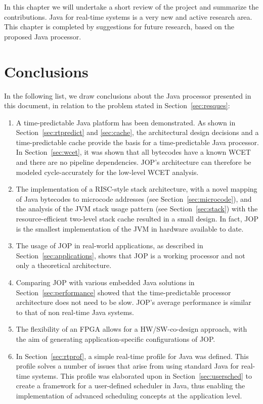 
In this chapter we will undertake a short review of the project and
summarize the contributions. Java for real-time systems is a very
new and active research area. This chapter is completed by
suggestions for future research, based on the proposed Java
processor.

\section{Conclusions}

In the following list, we draw conclusions about the Java processor
presented in this document, in relation to the problem stated in
Section~\ref{sec:resques}:
\begin{enumerate}
    \item
A time-predictable Java platform has been demonstrated. As shown in
Section~\ref{sec:rtpredict} and \ref{sec:cache}, the architectural
design decisions and a time-predictable cache provide the basis for
a time-predictable Java processor. In Section~\ref{sec:wcet}, it was
shown that all bytecodes have a known WCET and there are no pipeline
dependencies. JOP's architecture can therefore be modeled
cycle-accurately for the low-level WCET analysis.
    \item
The implementation of a RISC-style stack architecture, with a novel
mapping of Java bytecodes to microcode addresses (see
Section~\ref{sec:microcode}), and the analysis of the JVM stack
usage pattern (see Section~\ref{sec:stack}) with the
resource-efficient two-level stack cache resulted in a small design.
In fact, JOP is the smallest implementation of the JVM in hardware
available to date.
    \item
The usage of JOP in real-world applications, as described in
Section~\ref{sec:applications}, shows that JOP is a working
processor and not only a theoretical architecture.
    \item
Comparing JOP with various embedded Java solutions in
Section~\ref{sec:performance} showed that the time-predictable
processor architecture does not need to be slow. JOP's average
performance is similar to that of non real-time Java systems.
    \item
The flexibility of an FPGA allows for a HW/SW-co-design approach,
with the aim of generating application-specific configurations of
JOP.
    \item
In Section~\ref{sec:rtprof}, a simple real-time profile for Java was
defined. This profile solves a number of issues that arise from
using standard Java for real-time systems. This profile was
elaborated upon in Section~\ref{sec:usersched} to create a framework
for a user-defined scheduler in Java, thus enabling the
implementation of advanced scheduling concepts at the application
level.
\end{enumerate}

